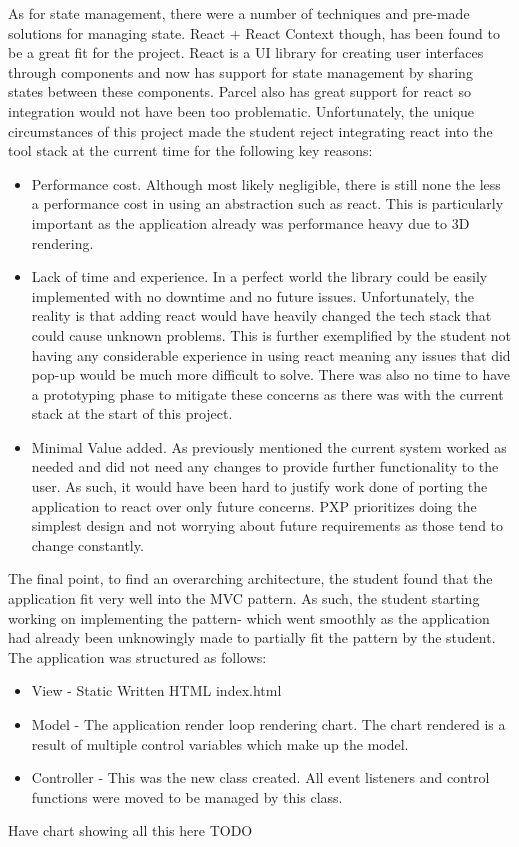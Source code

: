 As for state management, there were a number of techniques and pre-made solutions for managing state. React + React Context though, has been found to be a great fit for the project. React is a UI library for creating user interfaces through components and now has support for state management by sharing states between these components. Parcel also has great support for react so integration would not have been too problematic. Unfortunately, the unique circumstances of this project made the student reject integrating react into the tool stack at the current time for the following key reasons:
\begin{itemize}
    \item Performance cost. Although most likely negligible, there is still none the less a performance cost in using an abstraction such as react. This is particularly important as the application already was performance heavy due to 3D rendering.
    \item Lack of time and experience. In a perfect world the library could be easily implemented with no downtime and no future issues. Unfortunately, the reality is that adding react would have heavily changed the tech stack that could cause unknown problems. This is further exemplified by the student not having any considerable experience in using react meaning any issues that did pop-up would be much more difficult to solve. There was also no time to have a prototyping phase to mitigate these concerns as there was with the current stack at the start of this project.
    \item Minimal Value added. As previously mentioned the current system worked as needed and did not need any changes to provide further functionality to the user. As such, it would have been hard to justify work done of porting the application to react over only future concerns. PXP prioritizes doing the simplest design and not worrying about future requirements as those tend to change constantly.
\end{itemize}

The final point, to find an overarching architecture, the student found that the application fit very well into the MVC pattern. As such, the student starting working on implementing the pattern- which went smoothly as the application had already been unknowingly made to partially fit the pattern by the student.
The application was structured as follows:
\begin{itemize}
    \item View - Static Written HTML index.html
    \item Model - The application render loop rendering chart. The chart rendered is a result of multiple control variables which make up the model.
    \item Controller - This was the new class created. All event listeners and control functions were moved to be managed by this class.
\end{itemize}
Have chart showing all this here TODO

